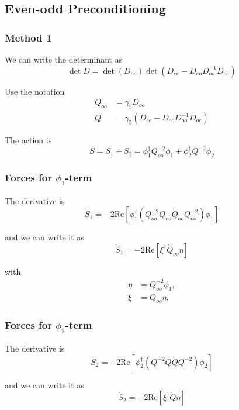 \documentclass[12pt]{article}
\newcommand{\re}{\mathrm{Re}}
\begin{document}
\subsection*{Even-odd Preconditioning}
\subsubsection*{Method 1}
We can write the determinant as
\begin{equation}
 \det D = \det(D_{oo})\det(D_{ee}-D_{eo}D_{oo}^{-1}D_{oe})
\end{equation}

Use the notation
\begin{align}
 Q_{oo} &= \gamma_5D_{oo} \\
 Q &= \gamma_5(D_{ee}-D_{eo}D_{oo}^{-1}D_{oe})
\end{align}

The action is
\begin{equation}
 S = S_1 + S_2 = \phi_1^\dagger Q_{oo}^{-2}\phi_1 + \phi_2^\dagger Q^{-2}\phi_2
\end{equation}

\subsubsection*{Forces for $\phi_1$-term}
The derivative is
\begin{equation}
 \dot{S}_1 = -2\re\left[\phi_1^\dagger(Q_{oo}^{-2}Q_{oo}\dot{Q}_{oo}Q_{oo}^{-2})\phi_1\right]
\end{equation}

and we can write it as
\begin{equation}
 \dot{S}_1 = -2\re\left[\xi^\dagger\dot{Q}_{oo}\eta\right]
\end{equation}

with
\begin{align}
 \eta &= Q_{oo}^{-2}\phi_1, \\
 \xi &= Q_{oo}\eta.
\end{align}

\subsubsection*{Forces for $\phi_2$-term}
The derivative is
\begin{equation}
 \dot{S}_2 = -2\re\left[\phi_2^\dagger(Q^{-2}Q\dot{Q}Q^{-2})\phi_2\right]
\end{equation}

and we can write it as
\begin{equation}
 \dot{S}_2 = -2\re\left[\xi^\dagger\dot{Q}\eta\right]
\end{equation}
\end{document}
